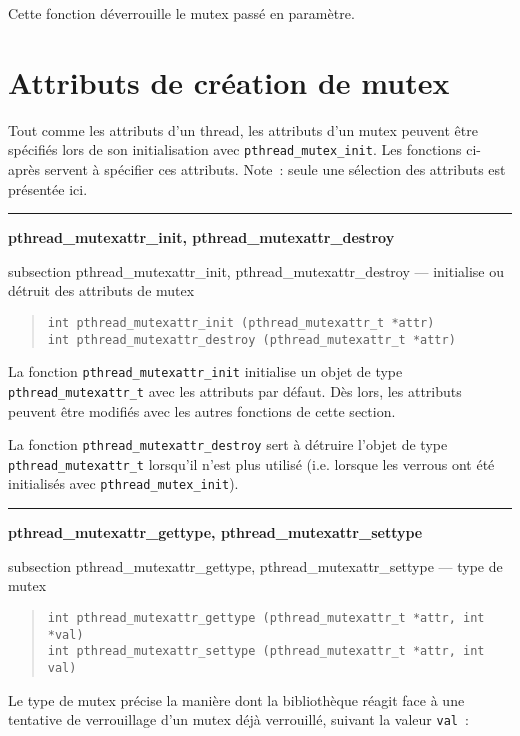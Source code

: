 \documentclass [twoside] {report}
\newcommand {\primitive} [1]
    {
	{\large \bf #1}
	\addcontentsline {toc} {subsection} {#1}
    }
\newcommand {\separation}
    {
	\vspace {7mm}
	\nopagebreak
	\hrule
    }
\begin{document}
Cette fonction déverrouille le mutex passé en paramètre.


\section {Attributs de création de mutex}

Tout comme les attributs d'un thread, les attributs d'un
mutex peuvent être spécifiés lors de son initialisation avec
\verb|pthread_mutex_init|. Les fonctions ci-après servent à spécifier
ces attributs.
Note~: seule une sélection des attributs est présentée ici.

\separation
\primitive {pthread\_mutexattr\_init, pthread\_mutexattr\_destroy} ---
initialise ou détruit des attributs de mutex

\begin {quote}
\begin {verbatim}
int pthread_mutexattr_init (pthread_mutexattr_t *attr)
int pthread_mutexattr_destroy (pthread_mutexattr_t *attr)
\end{verbatim}
\end {quote}

La fonction \verb|pthread_mutexattr_init| initialise un objet de type
\verb|pthread_mutexattr_t| avec les attributs par défaut. Dès lors, les
attributs peuvent être modifiés avec les autres fonctions de cette
section.

La fonction \verb|pthread_mutexattr_destroy| sert à détruire l'objet de type
\verb|pthread_mutexattr_t| lorsqu'il n'est plus utilisé (i.e.  lorsque les
verrous ont été initialisés avec \verb|pthread_mutex_init|).


\separation
\primitive {pthread\_mutexattr\_gettype, pthread\_mutexattr\_settype} --- type de mutex

\begin {quote}
\begin {verbatim}
int pthread_mutexattr_gettype (pthread_mutexattr_t *attr, int *val)
int pthread_mutexattr_settype (pthread_mutexattr_t *attr, int val)
\end{verbatim}
\end {quote}

Le type de mutex précise la manière dont la bibliothèque réagit
face à une tentative de verrouillage d'un mutex déjà verrouillé,
suivant la valeur \texttt {val}~:
\end{document}
